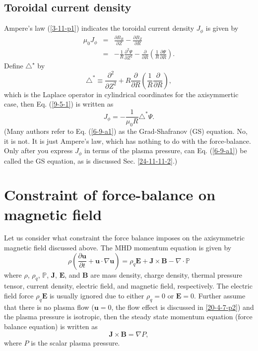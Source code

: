 \documentclass{llncs}
\begin{document}
\subsection{Toroidal current density}

Ampere's law (\ref{3-11-p1}) indicates the toroidal current density $J_{\phi}$
is given by
\begin{eqnarray}
  \mu_0 J_{\phi} & = & \frac{\partial B_R}{\partial Z} - \frac{\partial
  B_Z}{\partial R} \nonumber\\
  & = & - \frac{1}{R} \frac{\partial^2 \Psi}{\partial Z^2} -
  \frac{\partial}{\partial R} \left( \frac{1}{R} \frac{\partial \Psi}{\partial
  R} \right) .  \label{9-5-1}
\end{eqnarray}
Define $\triangle^{\star}$ by
\begin{equation}
  \triangle^{\ast} \equiv \frac{\partial^2}{\partial Z^2} + R
  \frac{\partial}{\partial R} \left( \frac{1}{R} \frac{\partial}{\partial R}
  \right),
\end{equation}
which is the Laplace operator in cylindrical coordinates for the axisymmertic
case, then Eq. (\ref{9-5-1}) is written as
\begin{equation}
  \label{6-9-a1} J_{\phi} = - \frac{1}{\mu_0 R} \triangle^{\ast} \Psi .
\end{equation}
(Many authors refer to Eq. (\ref{6-9-a1}) as the Grad-Shafranov (GS) equation.
No, it is not. It is just Ampere's law, which has nothing to do with the
force-balance. Only after you express $J_{\phi}$ in terms of the plasma
pressure, can Eq. (\ref{6-9-a1}) be called the GS equation, as is discussed
Sec. \ref{24-11-11-2}.)

\section{Constraint of force-balance on magnetic field}\label{24-11-11-1}

Let us consider what constraint the force balance imposes on the axisymmetric
magnetic field discussed above. The MHD momentum equation is given by
\begin{equation}
  \label{19-5-5-1} \rho \left( \frac{\partial \mathbf{u}}{\partial t}
  +\mathbf{u} \cdot \nabla \mathbf{u} \right) = \rho_q \mathbf{E}+\mathbf{J}
  \times \mathbf{B}- \nabla \cdot \mathbb{P}
\end{equation}
where $\rho$, $\rho_q$, $\mathbb{P}$, $\mathbf{J}$, $\mathbf{E}$, and
$\mathbf{B}$ are mass density, charge density, thermal pressure tensor,
current density, electric field, and magnetic field, respectively. The
electric field force $\rho_q \mathbf{E}$ is usually ignored due to either
$\rho_q = 0$ or $\mathbf{E}= 0$. Further assume that there is no plasma flow
($\mathbf{u}= 0$, the flow effect is discussed in \ref{20-4-7-p2}) and the
plasma pressure is isotropic, then the steady state momentum equation (force
balance equation) is written as
\begin{equation}
  \label{7-7-force} \mathbf{J} \times \mathbf{B}= \nabla P,
\end{equation}
where $P$ is the scalar plasma pressure.
\end{document}
